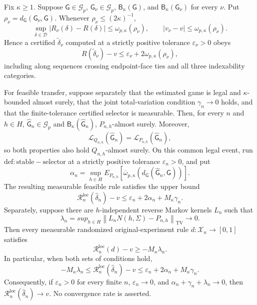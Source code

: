 Fix \(\kappa\geq 1\). Suppose \(\mathsf G\in\mathcal G_p\), \(\mathsf G_{\nu}\in\mathcal G_p\), \(\mathsf B_{\kappa}(\mathsf G)\), and \(\mathsf B_{\kappa}(\mathsf G_{\nu})\) for every \(\nu\). Put \(\rho_{\nu}=d_{\mathsf G}(\mathsf G_{\nu},\mathsf G)\). Whenever \(\rho_{\nu}\leq(2\kappa)^{-1}\),
\[
 \sup_{\delta\in\mathcal D}\lvert R_{\nu}(\delta)-R(\delta)\rvert
 \leq\omega_{p,\kappa}(\rho_{\nu}),
 \qquad
 \lvert v_{\nu}-v\rvert\leq\omega_{p,\kappa}(\rho_{\nu}).
\]
Hence a certified \(\widetilde\delta_{\nu}\) computed at a strictly positive tolerance \(\varepsilon_{\nu}>0\) obeys
\[
 R(\widetilde\delta_{\nu})-v
 \leq\varepsilon_{\nu}+2\omega_{p,\kappa}(\rho_{\nu}),
\]
including along sequences crossing endpoint-face ties and all three indexability categories.

For feasible transfer, suppose separately that the estimated game is legal and \(\kappa\)-bounded almost surely, that the joint total-variation condition \(\gamma_n\to0\) holds, and that the finite-tolerance certified selector is measurable. Then, for every \(n\) and \(h\in H\), \(\widehat{\mathsf G}_n\in\mathcal G_p\) and \(\mathsf B_{\kappa}(\widehat{\mathsf G}_n)\), \(P_{n,h}\)-almost surely. Moreover,
\[
 \mathcal L_{Q_{n,h}}(\widehat{\mathsf G}_n)
 =\mathcal L_{P_{n,h}}(\widehat{\mathsf G}_n),
\]
so both properties also hold \(Q_{n,h}\)-almost surely. On this common legal event, run \(\mathrm{def:stable-selector}\) at a strictly positive tolerance \(\varepsilon_n>0\), and put
\[
 \alpha_n=\sup_{h\in H}E_{P_{n,h}}\!\left[
 \overline\omega_{p,\kappa}\!\left(
 d_{\mathsf G}(\widehat{\mathsf G}_n,\mathsf G)
 \right)\right].
\]
The resulting measurable feasible rule satisfies the upper bound
\[
 \mathcal R_n^{\mathrm{loc}}(\widehat\delta_n)-v
 \leq\varepsilon_n+2\alpha_n+M_{\kappa}\gamma_n.
\]
Separately, suppose there are \(h\)-independent reverse Markov kernels \(L_n\) such that
\[
 \lambda_n=sup_{h\in H}
 \left\lVert L_nN(h,\Sigma)-P_{n,h}\right\rVert_{\mathrm{TV}}
 \longrightarrow0.
\]
Then every measurable randomized original-experiment rule \(d:\mathcal X_n\to[0,1]\) satisfies
\[
 \mathcal R_n^{\mathrm{loc}}(d)-v\geq-M_{\kappa}\lambda_n.
\]
In particular, when both sets of conditions hold,
\[
 -M_{\kappa}\lambda_n
 \leq\mathcal R_n^{\mathrm{loc}}(\widehat\delta_n)-v
 \leq\varepsilon_n+2\alpha_n+M_{\kappa}\gamma_n.
\]
Consequently, if \(\varepsilon_n>0\) for every finite \(n\), \(\varepsilon_n\to0\), and \(\alpha_n+\gamma_n+\lambda_n\to0\), then \(\mathcal R_n^{\mathrm{loc}}(\widehat\delta_n)\to v\). No convergence rate is asserted.

